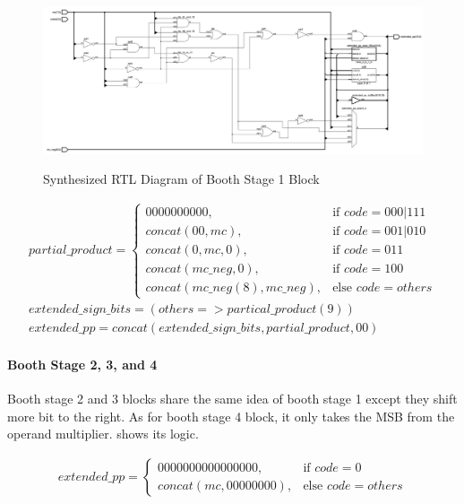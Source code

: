 \begin{figure}[!ht]
	\centering
	\caption{Synthesized RTL Diagram of Booth Stage 1 Block}
	\includegraphics[width=\textwidth]{../img/booth_stage_1_rtl.png}
	\label{fig:booth_stage_1_rtl}
\end{figure}

\begin{equation}
	\begin{array}{c}
		partial\_product =
		\begin{cases}
			0000000000,                 & \text{if } code = 000 | 111 \\
			concat(00, mc),             & \text{if } code = 001 | 010 \\
			concat(0, mc, 0),           & \text{if } code = 011       \\
			concat(mc\_neg, 0),         & \text{if } code = 100       \\
			concat(mc\_neg(8),mc\_neg), & \text{else } code = others
		\end{cases} \\
		extended\_sign\_bits = (others => partical\_product(9))   \\
		extended\_pp = concat(extended\_sign\_bits, partial\_product, 00)
	\end{array}
	\label{exp:booth_stage_1}
\end{equation}

\paragraph{Booth Stage 2, 3, and 4}
Booth stage 2 and 3 blocks share the same idea of booth stage 1 except they shift more bit to the right.
As for booth stage 4 block, it only takes the MSB from the operand multiplier.  shows its logic.

\begin{equation}
	\begin{array}{c}
		extended\_pp =
		\begin{cases}
			0000000000000000,    & \text{if } code = 0        \\
			concat(mc,00000000), & \text{else } code = others
		\end{cases} \\
	\end{array}
	\label{exp:booth_stage_4}
\end{equation}

